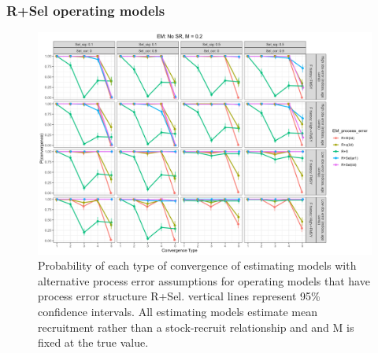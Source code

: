 \documentclass[
  12pt,
]{article}
\begin{document}
\hypertarget{rsel-operating-models}{%
\subsubsection{R+Sel operating models}\label{rsel-operating-models}}

\begin{landscape}
\begin{figure}
\caption{Probability of each type of convergence of estimating models with alternative process error assumptions for operating models that have process error structure R+Sel. vertical lines represent 95\% confidence intervals. All estimating models estimate mean recruitment rather than a stock-recruit relationship and and M is fixed at the true value.}\label{Sel_om_em_R_MF_convergence}
\begin{center}
\includegraphics[width = \textwidth]{Sel_om_p_convergence_meanR_M_fixed.png}
\end{center}
\end{figure}
\end{landscape}
\end{document}

